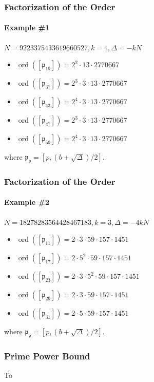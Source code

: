 \documentclass{beamer}
\DeclareMathOperator{\ord}{ord}
\newcommand{\ideal}{\mathfrak}
\newcommand{\idealclass}[1]{\left[ \ideal #1 \right]}
\begin{document}
\begin{frame}
\frametitle{Factorization of the Order}
\framesubtitle{Example \#1}

$N = 9223375433619660527, k = 1, \Delta = -kN$
\begin{itemize}
\item $\ord(\idealclass{p_{19}}) = 2^2 \cdot 13 \cdot 2770667$
\item $\ord(\idealclass{p_{37}}) = 2^3 \cdot 3 \cdot 13 \cdot 2770667$
\item $\ord(\idealclass{p_{43}}) = 2^4 \cdot 3 \cdot 13 \cdot 2770667$
\item $\ord(\idealclass{p_{47}}) = 2^3 \cdot 3 \cdot 13 \cdot 2770667$
\item $\ord(\idealclass{p_{59}}) = 2^4 \cdot 3 \cdot 13 \cdot 2770667$
\end{itemize}

where $\ideal{p_p} = [p, (b + \sqrt\Delta)/2]$.

\end{frame}

\begin{frame}
\frametitle{Factorization of the Order}
\framesubtitle{Example \#2}

$N = 18278283564428467183, k = 3, \Delta = -4kN$
\begin{itemize}
\item $\ord(\idealclass{p_{11}}) = 2 \cdot 3 \cdot 59 \cdot 157 \cdot 1451$
\item $\ord(\idealclass{p_{17}}) = 2 \cdot 5^2 \cdot 59 \cdot 157 \cdot 1451$
\item $\ord(\idealclass{p_{23}}) = 2 \cdot 3 \cdot 5^2 \cdot 59 \cdot 157 \cdot 1451$
\item $\ord(\idealclass{p_{29}}) = 2 \cdot 3 \cdot 59 \cdot 157 \cdot 1451$
\item $\ord(\idealclass{p_{31}}) = 2 \cdot 5 \cdot 59 \cdot 157 \cdot 1451$

\end{itemize}

where $\ideal{p_p} = [p, (b + \sqrt\Delta)/2]$.

\end{frame}

\begin{frame}
\frametitle{Prime Power Bound}
To 

\end{frame}
\end{document}
